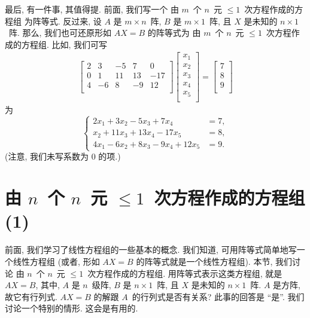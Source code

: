 \documentclass[../libro.tex]{subfiles}
\begin{document}
最后, 有一件事, 其值得提.
前面, 我们写一个%
由 \(m\)~个 \(n\)~元 \({\leq} 1\)~次方程作成的方程组%
为阵等式.
反过来,
设 \(A\) 是 \(m \times n\)~阵,
\(B\) 是 \(m \times 1\)~阵,
且 \(X\) 是未知的 \(n \times 1\)~阵.
那么, 我们也可还原形如 \(AX = B\) 的阵等式为%
由 \(m\)~个 \(n\)~元 \({\leq} 1\)~次方程作成的方程组.
比如, 我们可写
\begin{align*}
    \begin{bmatrix}
        2 & 3  & -5 & 7  & 0   \\
        0 & 1  & 11 & 13 & -17 \\
        4 & -6 & 8  & -9 & 12  \\
    \end{bmatrix}
    \begin{bmatrix}
        x_1 \\
        x_2 \\
        x_3 \\
        x_4 \\
        x_5 \\
    \end{bmatrix}
    =
    \begin{bmatrix}
        7 \\
        8 \\
        9 \\
    \end{bmatrix}
\end{align*}
为
\begin{equation*}
    \left\{ %
    \begin{aligned}
        2x_1 + 3x_2 - 5x_3 + 7x_4         & = 7, \\
        x_2 + 11x_3 + 13x_4 - 17x_5       & = 8, \\
        4x_1 - 6x_2 + 8x_3 - 9x_4 + 12x_5 & = 9.
    \end{aligned}
    \right. %
\end{equation*}
(注意, 我们未写系数为 \(0\) 的项.)

\section{\texorpdfstring{由 \(n\)~个 \(n\)~元
    \({\leq} 1\)~次方程作成的方程组 (1)}%
{由 n 个 n 元 ≤1 次方程作成的方程组 (1)}}

前面, 我们学习了线性方程组的一些基本的概念.
我们知道, 可用阵等式简单地写一个线性方程组
(或者, 形如 \(AX = B\) 的阵等式就是一个线性方程组).
本节, 我们讨论%
由 \(n\)~个 \(n\)~元 \({\leq} 1\)~次方程作成的方程组.
用阵等式表示这类方程组,
就是 \(AX = B\),
其中, \(A\) 是 \(n\)~级阵,
\(B\) 是 \(n \times 1\)~阵,
且 \(X\) 是未知的 \(n \times 1\)~阵.
\(A\) 是方阵, 故它有行列式.
\(AX = B\) 的解跟 \(A\)~的行列式是否有关系?
此事的回答是 ``是''.
我们讨论一个特别的情形.
这会是有用的.
\end{document}
